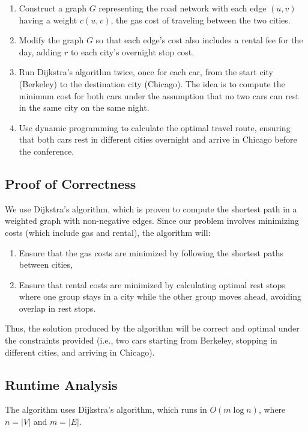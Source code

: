 \documentclass[11pt]{article}
\begin{document}
\begin{enumerate}
    \item Construct a graph \( G \) representing the road network with each edge \( (u, v) \) having a weight \( c(u, v) \), the gas cost of traveling between the two cities.
    \item Modify the graph \( G \) so that each edge's cost also includes a rental fee for the day, adding \( r \) to each city's overnight stop cost.
    \item Run Dijkstra’s algorithm twice, once for each car, from the start city (Berkeley) to the destination city (Chicago). The idea is to compute the minimum cost for both cars under the assumption that no two cars can rest in the same city on the same night.
    \item Use dynamic programming to calculate the optimal travel route, ensuring that both cars rest in different cities overnight and arrive in Chicago before the conference.
\end{enumerate}

\subsection*{Proof of Correctness}
We use Dijkstra's algorithm, which is proven to compute the shortest path in a weighted graph with non-negative edges. Since our problem involves minimizing costs (which include gas and rental), the algorithm will:

\begin{enumerate}
    \item Ensure that the gas costs are minimized by following the shortest paths between cities,
    \item Ensure that rental costs are minimized by calculating optimal rest stops where one group stays in a city while the other group moves ahead, avoiding overlap in rest stops.
\end{enumerate}

Thus, the solution produced by the algorithm will be correct and optimal under the constraints provided (i.e., two cars starting from Berkeley, stopping in different cities, and arriving in Chicago).

\subsection*{Runtime Analysis}
The algorithm uses Dijkstra's algorithm, which runs in \( O(m \log n) \), where \( n = |V| \) and \( m = |E| \).
\end{document}
